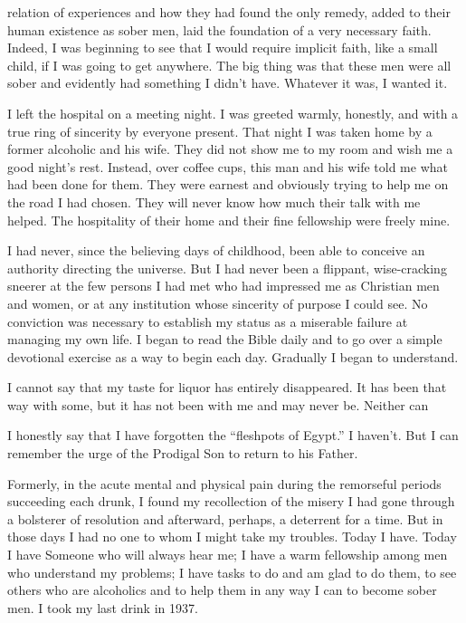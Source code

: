 relation of experiences and how they had found the only remedy, added to their human existence as sober men, laid the foundation of a very necessary faith. Indeed, I was beginning to see that I would require implicit faith, like a small child, if I was going to get anywhere. The big thing was that these men were all sober and evidently had something I didn’t have. Whatever it was, I wanted it.

I left the hospital on a meeting night. I was greeted warmly, honestly, and with a true ring of sincerity by everyone present. That night I was taken home by a former alcoholic and his wife. They did not show me to my room and wish me a good night’s rest. Instead, over coffee cups, this man and his wife told me what had been done for them. They were earnest and obviously trying to help me on the road I had chosen. They will never know how much their talk with me helped. The hospitality of their home and their fine fellowship were freely mine.

I had never, since the believing days of childhood, been able to conceive an authority directing the universe. But I had never been a flippant, wise-cracking sneerer at the few persons I had met who had impressed me as Christian men and women, or at any institution whose sincerity of purpose I could see. No conviction was necessary to establish my status as a miserable failure at managing my own life. I began to read the Bible daily and to go over a simple devotional exercise as a way to begin each day. Gradually I began to understand.

I cannot say that my taste for liquor has entirely disappeared. It has been that way with some, but it has not been with me and may never be. Neither can

I honestly say that I have forgotten the “fleshpots of Egypt.” I haven’t. But I can remember the urge of the Prodigal Son to return to his Father.

Formerly, in the acute mental and physical pain during the remorseful periods succeeding each drunk, I found my recollection of the misery I had gone through a bolsterer of resolution and afterward, perhaps, a deterrent for a time. But in those days I had no one to whom I might take my troubles. Today I have. Today I have Someone who will always hear me; I have a warm fellowship among men who understand my problems; I have tasks to do and am glad to do them, to see others who are alcoholics and to help them in any way I can to become sober men. I took my last drink in 1937.




